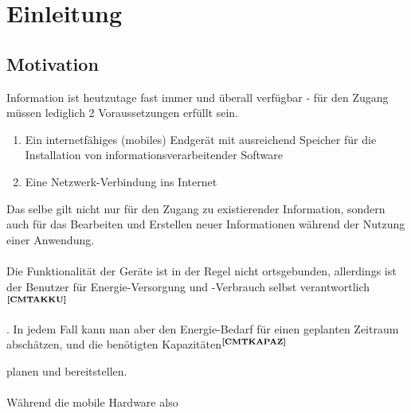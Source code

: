 %
%
\section{Einleitung}


\subsection{Motivation}
Information ist heutzutage fast immer und überall verfügbar - für den Zugang müssen lediglich 2 Voraussetzungen erfüllt sein.
\begin{enumerate}
\item Ein internetfähiges (mobiles) Endgerät mit ausreichend Speicher für die Installation von informationsverarbeitender Software
\item Eine Netzwerk-Verbindung ins Internet
\end{enumerate}
Das selbe gilt nicht nur für den Zugang zu existierender Information, sondern auch für das Bearbeiten und Erstellen neuer Informationen während der Nutzung einer Anwendung.\\ \\
\noindent
Die Funktionalität der Geräte ist in der Regel nicht ortsgebunden, allerdings ist der Benutzer für Energie-Versorgung und -Verbrauch selbst verantwortlich$^{\textbf{\ref{CMTAKKU}}}$%
\addtocounter{footnote}{1}%
. In jedem Fall kann man aber den Energie-Bedarf für einen geplanten Zeitraum abschätzen, und die benötigten Kapazitäten$^{\textbf{\ref{CMTKAPAZ}}}$%
\addtocounter{footnote}{1}%
 planen und bereitstellen.\\ \\
\noindent
Während die mobile Hardware also

